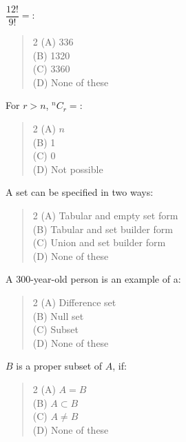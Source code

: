 \documentclass[11pt,a4paper]{article}
\begin{document}
\begin{mcqlist}
\item $\dfrac{12!}{9!}=$\underline{\hspace{1cm}}:
\begin{quote}\begin{multicols}{2}
\noindent (A) 336 \\
(B) 1320 \\
(C) 3360 \\
(D) None of these
\end{multicols}\end{quote}

\item For $r>n$, ${}^{n}C_r=$\underline{\hspace{1cm}}:
\begin{quote}\begin{multicols}{2}
\noindent (A) $n$ \\
(B) 1 \\
(C) 0 \\
(D) Not possible
\end{multicols}\end{quote}

\item A set can be specified in two ways:
\begin{quote}\begin{multicols}{2}
\noindent (A) Tabular and empty set form \\
(B) Tabular and set builder form \\
(C) Union and set builder form \\
(D) None of these
\end{multicols}\end{quote}

\item A 300-year-old person is an example of a:
\begin{quote}\begin{multicols}{2}
\noindent (A) Difference set \\
(B) Null set \\
(C) Subset \\
(D) None of these
\end{multicols}\end{quote}

\item $B$ is a proper subset of $A$, if:
\begin{quote}\begin{multicols}{2}
\noindent (A) $A=B$ \\
(B) $A\subset B$ \\
(C) $A\ne B$ \\
(D) None of these
\end{multicols}\end{quote}


\end{mcqlist}
\end{document}
